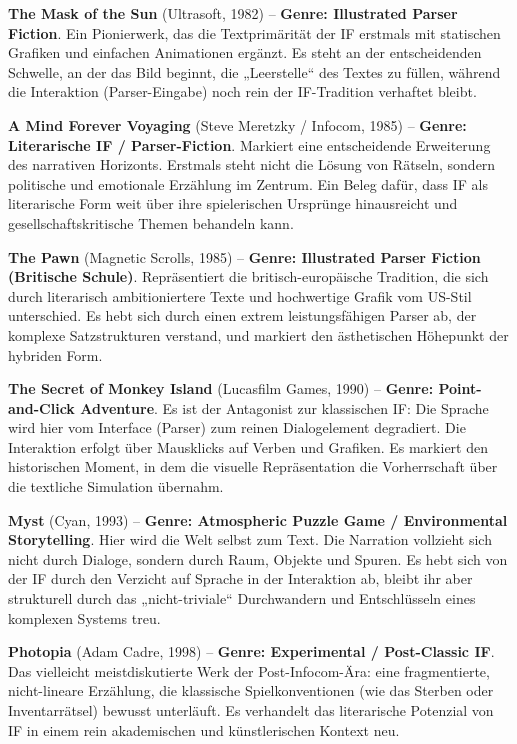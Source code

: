 \documentclass[parskip=half,a4paper,11pt]{scrreprt}
\begin{document}
\textbf{The Mask of the Sun} (Ultrasoft, 1982) – \textbf{Genre: Illustrated Parser Fiction}. Ein Pionierwerk, das die Textprimärität der IF erstmals mit statischen Grafiken und einfachen Animationen ergänzt. Es steht an der entscheidenden Schwelle, an der das Bild beginnt, die „Leerstelle“ des Textes zu füllen, während die Interaktion (Parser-Eingabe) noch rein der IF-Tradition verhaftet bleibt.

\textbf{A Mind Forever Voyaging} (Steve Meretzky / Infocom, 1985) – \textbf{Genre: Literarische IF / Parser-Fiction}. Markiert eine entscheidende Erweiterung des narrativen Horizonts. Erstmals steht nicht die Lösung von Rätseln, sondern politische und emotionale Erzählung im Zentrum. Ein Beleg dafür, dass IF als literarische Form weit über ihre spielerischen Ursprünge hinausreicht und gesellschaftskritische Themen behandeln kann.

\textbf{The Pawn} (Magnetic Scrolls, 1985) – \textbf{Genre: Illustrated Parser Fiction (Britische Schule)}. Repräsentiert die britisch-europäische Tradition, die sich durch literarisch ambitioniertere Texte und hochwertige Grafik vom US-Stil unterschied. Es hebt sich durch einen extrem leistungsfähigen Parser ab, der komplexe Satzstrukturen verstand, und markiert den ästhetischen Höhepunkt der hybriden Form.

\textbf{The Secret of Monkey Island} (Lucasfilm Games, 1990) – \textbf{Genre: Point-and-Click Adventure}. Es ist der Antagonist zur klassischen IF: Die Sprache wird hier vom Interface (Parser) zum reinen Dialogelement degradiert. Die Interaktion erfolgt über Mausklicks auf Verben und Grafiken. Es markiert den historischen Moment, in dem die visuelle Repräsentation die Vorherrschaft über die textliche Simulation übernahm.

\textbf{Myst} (Cyan, 1993) – \textbf{Genre: Atmospheric Puzzle Game / Environmental Storytelling}. Hier wird die Welt selbst zum Text. Die Narration vollzieht sich nicht durch Dialoge, sondern durch Raum, Objekte und Spuren. Es hebt sich von der IF durch den Verzicht auf Sprache in der Interaktion ab, bleibt ihr aber strukturell durch das „nicht-triviale“ Durchwandern und Entschlüsseln eines komplexen Systems treu.

\textbf{Photopia} (Adam Cadre, 1998) – \textbf{Genre: Experimental / Post-Classic IF}. Das vielleicht meistdiskutierte Werk der Post-Infocom-Ära: eine fragmentierte, nicht-lineare Erzählung, die klassische Spielkonventionen (wie das Sterben oder Inventarrätsel) bewusst unterläuft. Es verhandelt das literarische Potenzial von IF in einem rein akademischen und künstlerischen Kontext neu.
\end{document}
